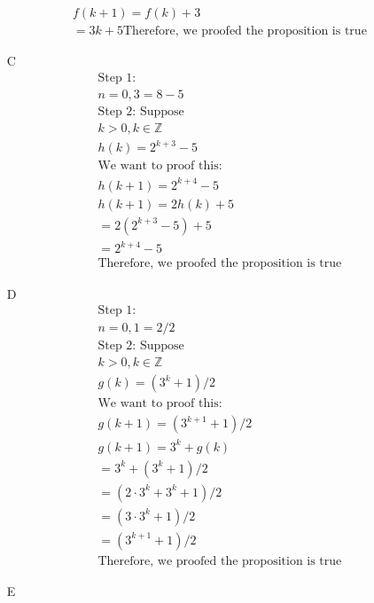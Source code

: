 \documentclass[12pt]{article}
\begin{document}
\begin{itemize}
\begin{equation*}
\begin{split}
		    f(k+1) = f(k) + 3\\
		    = 3k+5
		    \text{Therefore, we proofed the proposition is true}
		\end{split}
	\end{equation*}
    \item [C] 
	\begin{equation*}
		\begin{split}
		    \text{Step 1:}\\
		    n = 0, 3 = 8-5\\
		    \text{Step 2: Suppose}\\
		    k > 0, k \in \mathbb{Z }\\
		    h(k) = 2^{k+3}-5\\
		    \text{We want to proof this:}\\
		    h(k+1) = 2^{k+4}-5\\
		    h(k+1) = 2h(k) + 5\\
		    = 2(2^{k+3} -5) + 5\\
		    = 2^{k+4} - 5\\
		    \text{Therefore, we proofed the proposition is true}
		\end{split}
	\end{equation*}
    \item [D]
	\begin{equation*}
		\begin{split}
		    \text{Step 1:}\\
		    n = 0, 1 = 2/2\\
		    \text{Step 2: Suppose}\\
		    k > 0, k \in \mathbb{Z}\\
		    g(k) = (3^k + 1)/2\\
		    \text{We want to proof this:}\\
		    g(k+1) = (3^{k+1} + 1)/2\\
		    g(k+1) = 3^{k}+g(k)\\
		    = 3^k + (3^k + 1)/2\\
		    = (2\cdot 3^k + 3^k + 1)/2\\
		    = (3\cdot 3^k + 1)/2\\
		    = (3^{k+1} + 1)/2\\
		    \text{Therefore, we proofed the proposition is true}
		\end{split}
	\end{equation*}
    \item [E]
	\begin{equation*}
		\begin{split}

\end{split}
\end{equation*}
\end{itemize}
\end{document}
